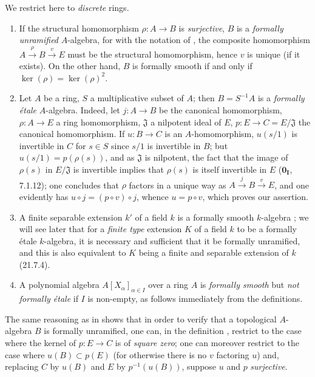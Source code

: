 \begin{examples}[19.10.3]
\label{0.19.10.3}
We restrict here to \emph{discrete} rings.
\begin{enumerate}
  \item[\rm(i)] If the structural homomorphism $\rho:A\to B$ is \emph{surjective}, $B$ is a \emph{formally unramified} $A$-algebra, for with the notation of , the composite homomorphism $A\xrightarrow{\rho}B\xrightarrow{v}E$ must be the structural homomorphism, hence $v$ is unique (if it exists).
On the other hand, $B$ is formally smooth if and only if $\ker(\rho)=\ker(\rho)^2$.
  \item[\rm(ii)] Let $A$ be a ring, $S$ a multiplicative subset of $A$; then $B=S^{-1}A$ is a \emph{formally \'{e}tale} $A$-algebra.
Indeed, let $j:A\to B$ be the canonical homomorphism, $\rho:A\to E$ a ring homomorphism, $\mathfrak{J}$ a nilpotent ideal of $E$, $p:E\to C=E/\mathfrak{J}$ the canonical homomorphism.
If $u:B\to C$ is an $A$-homomorphism, $u(s/1)$ is invertible in $C$ for $s\in S$ since $s/1$ is invertible in $B$; but $u(s/1)=p(\rho(s))$, and as $\mathfrak{J}$ is nilpotent, the fact that the image of $\rho(s)$ in $E/\mathfrak{J}$ is invertible implies that $\rho(s)$ is itself invertible in $E$ ($\mathbf{0_I}$, 7.1.12); one concludes that $\rho$ factors in a unique way as $A\xrightarrow{j}B\xrightarrow{v}E$, and one evidently has $u\circ j=(p\circ v)\circ j$, whence $u=p\circ v$, which proves our assertion.
  \item[\rm(iii)] A finite separable extension $k'$ of a field $k$ is a formally smooth $k$-algebra ; we will see later that for a \emph{finite type} extension $K$ of a field $k$ to be a formally \'{e}tale $k$-algebra, it is necessary and sufficient that it be formally unramified, and this is also equivalent to $K$ being a finite and separable extension of $k$ (21.7.4).
  \item[\rm(iv)] A polynomial algebra $A[X_\alpha]_{\alpha\in I}$ over a ring $A$ is \emph{formally smooth}  but \emph{not formally \'{e}tale} if $I$ is non-empty, as follows immediately from the definitions.
\end{enumerate}
\end{examples}

\begin{remark}[19.10.4]
\label{0.19.10.4}
The same reasoning as in  shows that in order to verify that a topological $A$-algebra $B$ is formally unramified, one can, in the definition , restrict to the case where the kernel of $p:E\to C$ is of \emph{square zero}; one can moreover restrict to the case where $u(B)\subset p(E)$ (for otherwise there is no $v$ factoring $u$) and, replacing $C$ by $u(B)$ and $E$ by $p^{-1}(u(B))$, suppose $u$ and $p$ \emph{surjective}.
\end{remark}
